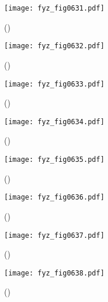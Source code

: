     \begin{figure}[ht!] %
      \centering
      \texttt{[image: fyz\_fig0631.pdf]}
      \caption{
               (\cite[s.~707]{Feynman02})}
      \label{fyz:fig0631}
    \end{figure}

    \begin{figure}[ht!] %
      \centering
      \texttt{[image: fyz\_fig0632.pdf]}
      \caption{
               (\cite[s.~707]{Feynman02})}
      \label{fyz:fig0632}
    \end{figure}

    \begin{figure}[ht!] %
      \centering
      \texttt{[image: fyz\_fig0633.pdf]}
      \caption{
               (\cite[s.~707]{Feynman02})}
      \label{fyz:fig0633}
    \end{figure}

    \begin{figure}[ht!] %
      \centering
      \texttt{[image: fyz\_fig0634.pdf]}
      \caption{
               (\cite[s.~707]{Feynman02})}
      \label{fyz:fig0634}
    \end{figure}

    \begin{figure}[ht!] %
      \centering
      \texttt{[image: fyz\_fig0635.pdf]}
      \caption{
               (\cite[s.~707]{Feynman02})}
      \label{fyz:fig0635}
    \end{figure}

    \begin{figure}[ht!] %
      \centering
      \texttt{[image: fyz\_fig0636.pdf]}
      \caption{
               (\cite[s.~707]{Feynman02})}
      \label{fyz:fig0636}
    \end{figure}

    \begin{figure}[ht!] %
      \centering
      \texttt{[image: fyz\_fig0637.pdf]}
      \caption{
               (\cite[s.~707]{Feynman02})}
      \label{fyz:fig0637}
    \end{figure}

    \begin{figure}[ht!] %
      \centering
      \texttt{[image: fyz\_fig0638.pdf]}
      \caption{
               (\cite[s.~707]{Feynman02})}
      \label{fyz:fig0638}
    \end{figure}

